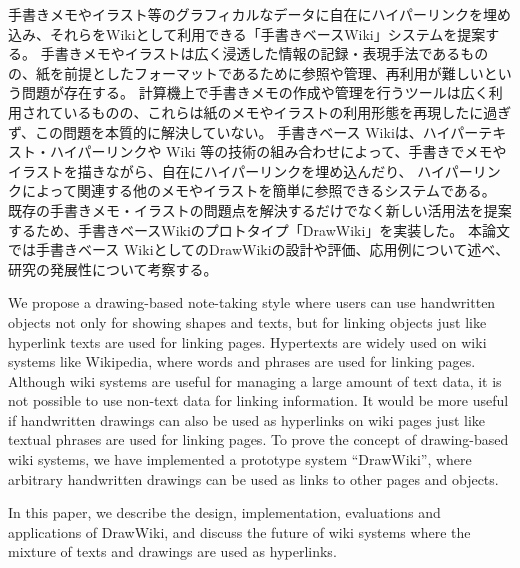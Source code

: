 


\begin{jabstract}

 手書きメモやイラスト等のグラフィカルなデータに自在にハイパーリンクを埋め込み、それらをWikiとして利用できる「手書きベースWiki」システムを提案する。
 手書きメモやイラストは広く浸透した情報の記録・表現手法であるものの、紙を前提としたフォーマットであるために参照や管理、再利用が難しいという問題が存在する。
 計算機上で手書きメモの作成や管理を行うツールは広く利用されているものの、これらは紙のメモやイラストの利用形態を再現したに過ぎず、この問題を本質的に解決していない。
 手書きベース Wikiは、ハイパーテキスト・ハイパーリンクや Wiki 等の技術の組み合わせによって、手書きでメモやイラストを描きながら、自在にハイパーリンクを埋め込んだり、
 ハイパーリンクによって関連する他のメモやイラストを簡単に参照できるシステムである。
 既存の手書きメモ・イラストの問題点を解決するだけでなく新しい活用法を提案するため、手書きベースWikiのプロトタイプ「DrawWiki」を実装した。
 本論文では手書きベース WikiとしてのDrawWikiの設計や評価、応用例について述べ、研究の発展性について考察する。

\end{jabstract}


\begin{eabstract}

 We propose a drawing-based note-taking style where users can use handwritten objects not only for showing shapes and texts,
 but for linking objects just like hyperlink texts are used for linking pages.
 Hypertexts are widely used on wiki systems like Wikipedia, where words and phrases are used for linking pages.
 Although wiki systems are useful for managing a large amount of text data, it is not possible to use non-text data for linking information.
 It would be more useful if handwritten drawings can also be used as hyperlinks on wiki pages just like textual phrases are used for linking pages.
 To prove the concept of drawing-based wiki systems, we have implemented a prototype system “DrawWiki”, where arbitrary handwritten drawings can be used as links to other pages and objects.

 In this paper, we describe the design, implementation, evaluations and applications of DrawWiki, and discuss the future of wiki systems where the mixture of texts and drawings are used as hyperlinks.


\end{eabstract}
